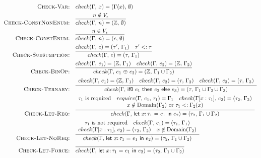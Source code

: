 \documentclass[peerreview, 10pt]{IEEEtran}
\newcommand{\Z}{\ensuremath{\mathbb{Z}}}
\newcommand{\lett}[4]{\ensuremath{\mathsf{let}\ #1\mathsf{:}\,#2\ \mathsf{=}\ #3\ \mathsf{in}\ #4}}
\newcommand{\binop}[2]{\ensuremath{#1\ \mathsf{\oplus}\ #2}}
\newcommand{\ternary}[3]{\ensuremath{\mathsf{if0}\ #1\ \mathsf{then}\ #2\ \mathsf{else}\ #3}}
\newcommand{\checktype}[4]{\ensuremath{{check}(#1,\,#2)=(#3,\,#4)}}
\newcommand{\requiretype}[4]{\ensuremath{{require}(#1,\,#2,\,#3)=#4}}
\newcommand{\required}[1]{\ensuremath{#1\text{ is required}}}
\newcommand{\nrequired}[1]{\ensuremath{#1\text{ is not required}}}
\begin{document}
\begin{figure*}[ht]
\normalsize
\centering
\begin{framed}
\begin{align*}
\text{\textsc{Check-Var:}} &\quad \checktype{\Gamma}{x}{\Gamma(x)}{\emptyset} \\
\text{\textsc{Check-ConstNonEnum:}} &\quad \infer{\checktype{\Gamma}{n}{\Z}{\emptyset}}{n \notin V_\epsilon} \\
\text{\textsc{Check-ConstEnum:}} &\quad \infer{\checktype{\Gamma}{n}{\epsilon}{\emptyset}}{n \in V_\epsilon} \\
\text{\textsc{Check-Subsumption:}} &\quad \infer{\checktype{\Gamma}{e}{\tau}{\Gamma_1}}{\checktype{\Gamma}{e}{\tau'}{\Gamma_1} \quad \tau' <: \tau} \\
\text{\textsc{Check-BinOp:}} &\quad \infer{\checktype{\Gamma}{\binop{e_1}{e_2}}{\Z}{\Gamma_1 \cup \Gamma_2}}{\checktype{\Gamma}{e_1}{\Z}{\Gamma_1} \quad \checktype{\Gamma}{e_2}{\Z}{\Gamma_2}} \\
\text{\textsc{Check-Ternary:}} &\quad \infer{\checktype{\Gamma}{\ternary{e_1}{e_2}{e_3}}{\tau}{\Gamma_1 \cup \Gamma_2 \cup \Gamma_3}}{
\begin{array}{c}
\checktype{\Gamma}{e_1}{\Z}{\Gamma_1} \quad
\checktype{\Gamma}{e_2}{\tau}{\Gamma_2} \quad \checktype{\Gamma}{e_3}{\tau}{\Gamma_3}
\end{array}
} \\
\text{\textsc{Check-Let-Req:}} &\quad \infer{\checktype{\Gamma}{\lett{x}{\tau_1}{e_1}{e_2}}{\tau_2}{\Gamma_1 \cup \Gamma_2}}{
\begin{array}{c}
\required{\tau_1} \quad \requiretype{\Gamma}{e_1}{\tau_1}{\Gamma_1} \quad
\checktype{\Gamma[x:\tau_1]}{e_2}{\tau_2}{\Gamma_2}\\
x \notin \text{Domain}(\Gamma_2) \text{ or } \tau_1 <: \Gamma_2(x)
\end{array}
} \\
\text{\textsc{Check-Let-NoReq:}} &\quad \infer{\checktype{\Gamma}{\lett{x}{\tau_1}{e_1}{e_2}}{\tau_2}{\Gamma_1 \cup \Gamma_2}}{
\begin{array}{c}
\nrequired{\tau_1} \quad \checktype{\Gamma}{e_1}{\tau_1}{\Gamma_1} \\
\checktype{\Gamma[x:\tau_1]}{e_2}{\tau_2}{\Gamma_2} \quad x \notin \text{Domain}(\Gamma_2)
\end{array}
} \\
\text{\textsc{Check-Let-Force:}} &\quad \infer{\checktype{\Gamma}{\lett{x}{\tau_1}{e_1}{e_2}}{\tau_2}{\Gamma_1 \cup \Gamma_2}}{
\begin{array}{c}

\end{array}}
\end{align*}
\end{framed}
\end{figure*}
\end{document}
